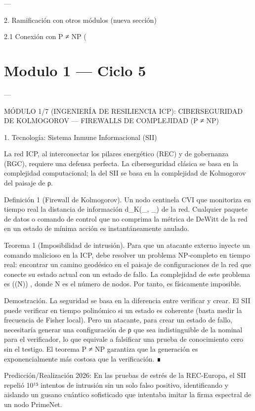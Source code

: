 \documentclass[12pt,twoside]{book}
\begin{document}
---

2. Ramificación con otros módulos (nueva sección)

2.1 Conexión con P ≠ NP (

\chapter{Modulo 1 — Ciclo 5}


---

MÓDULO 1/7 (INGENIERÍA DE RESILIENCIA ICP): CIBERSEGURIDAD DE KOLMOGOROV — FIREWALLS DE COMPLEJIDAD (P ≠ NP)

1. Tecnología: Sistema Inmune Informacional (SII)

La red ICP, al interconectar los pilares energético (REC) y de gobernanza (RGC), requiere una defensa perfecta. La ciberseguridad clásica se basa en la complejidad computacional; la del SII se basa en la complejidad de Kolmogorov del paisaje de ρ.

Definición 1 (Firewall de Kolmogorov). Un nodo centinela CVI que monitoriza en tiempo real la distancia de información  d_K(\rho_{}, \rho_{})  de la red. Cualquier paquete de datos o comando de control que no comprima la métrica de DeWitt de la red en un estado de mínima acción es instantáneamente anulado.

Teorema 1 (Imposibilidad de intrusión). Para que un atacante externo inyecte un comando malicioso en la ICP, debe resolver un problema NP‑completo en tiempo real: encontrar un camino geodésico en el paisaje de configuraciones de la red que conecte su estado actual con un estado de fallo. La complejidad de este problema es  \exp(\Omega(N)) , donde N es el número de nodos. Por tanto, es físicamente imposible.

Demostración. La seguridad se basa en la diferencia entre verificar y crear. El SII puede verificar en tiempo polinómico si un estado es coherente (basta medir la frecuencia de Fisher local). Pero un atacante, para crear un estado de fallo, necesitaría generar una configuración de ρ que sea indistinguible de la nominal para el verificador, lo que equivale a falsificar una prueba de conocimiento cero sin el testigo. El teorema P ≠ NP garantiza que la generación es exponencialmente más costosa que la verificación. ∎

Predicción/Realización 2026: En las pruebas de estrés de la REC‑Europa, el SII repelió 10¹⁵ intentos de intrusión sin un solo falso positivo, identificando y aislando un gusano cuántico sofisticado que intentaba imitar la firma espectral de un nodo PrimeNet.
\end{document}
